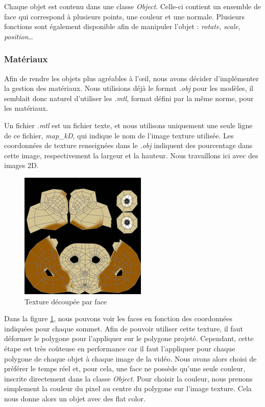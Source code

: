                 Chaque objet est contenu dans une classe \emph{Object}. Celle-ci contient un ensemble de face qui correspond à plusieurs points, une couleur et une normale. Plusieurs fonctions sont également disponible afin de manipuler l'objet : \emph{rotate}, \emph{scale}, \emph{position}\dots

            \subsubsection{Matériaux}
            \label{subsubsec:materiaux}

            Afin de rendre les objets plus agréables à l'\oe il, nous avons décider d'implémenter la gestion des matériaux. Nous utilisions déjà le format \emph{.obj} pour les modèles, il semblait donc naturel d'utiliser les \emph{.mtl}, format défini par la même norme, pour les matériaux. 

            Un fichier \emph{.mtl} est un fichier texte, et nous utilisons uniquement une seule ligne de ce fichier, \emph{map\_kD}, qui indique le nom de l'image texture utilisée. Les coordonnées de texture renseignées dans le \emph{.obj} indiquent des pourcentage dans cette image, respectivement la largeur et la hauteur. Nous travaillons ici avec des images 2D.

            \begin{figure}[h]
                \centering
                \includegraphics[scale=0.8]{img/rendu/texture.png}
                \caption{Texture découpée par face}
                \label{fig:texture}
            \end{figure}

            Dans la figure \ref{fig:texture}, nous pouvons voir les faces en fonction des coordonnées indiquées pour chaque sommet. Afin de pouvoir utiliser cette texture, il faut déformer le polygone pour l'appliquer sur le polygone projeté. Cependant, cette étape est très coûteuse en performance car il faut l'appliquer pour chaque polygone de chaque objet à chaque image de la vidéo. Nous avons alors choisi de préférer le temps réel et, pour cela, une face ne possède qu'une seule couleur, inscrite directement dans la classe \emph{Object}. Pour choisir la couleur, nous prenons simplement la couleur du pixel au centre du polygone sur l'image texture. Cela nous donne alors un objet avec des flat color. 
            
